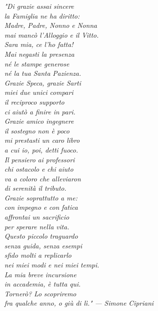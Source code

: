 \documentclass[12pt,a4paper]{scrbook}
\begin{document}
\frenchspacing
\raggedbottom
{}
\pagestyle{plain}

\pagestyle{scrheadings}
\tableofcontents
\listoffigures
\cleardoublepage
\thispagestyle{empty}
\begin{flushright}
\null{}
\emph{"Di grazie assai sincere\\ la Famiglia ne ha diritto:\\ Madre, Padre, Nonno e Nonna\\ mai mancò l'Alloggio e il Vitto.\\ \vspace{0.3cm} Sara mia, ce l'ho fatta!\\ Mai negasti la presenza\\ né le stampe generose\\ né la tua Santa Pazienza.\\ \vspace{0.3cm} Grazie Speca, grazie Sarti\\ miei due unici compari\\ il reciproco supporto\\ ci aiutò a finire in pari.\\ \vspace{0.3cm} Grazie amico ingegnere\\ il sostegno non è poco\\ mi prestasti un caro libro\\ a cui io, poi, detti fuoco.\\ \vspace{0.3cm} Il pensiero ai professori\\ chi ostacolo e chi aiuto\\ va a coloro che alleviaron\\ di serenità il tributo.\\ \vspace{0.3cm} Grazie soprattutto a me:\\ con impegno e con fatica\\ affrontai un sacrificio\\ per sperare nella vita.\\ \vspace{0.3cm} Questo piccolo traguardo\\ senza guida, senza esempi\\ sfido molti a replicarlo\\ nei miei modi e nei miei tempi.\\ \vspace{0.3cm} La mia breve incursione \\ in accademia, è tutta qui.\\ Tornerò? Lo scopriremo\\ fra qualche anno, o giù di lì." \vspace{0.5cm} \break --- Simone Cipriani} \null
\end{flushright}
\end{document}
